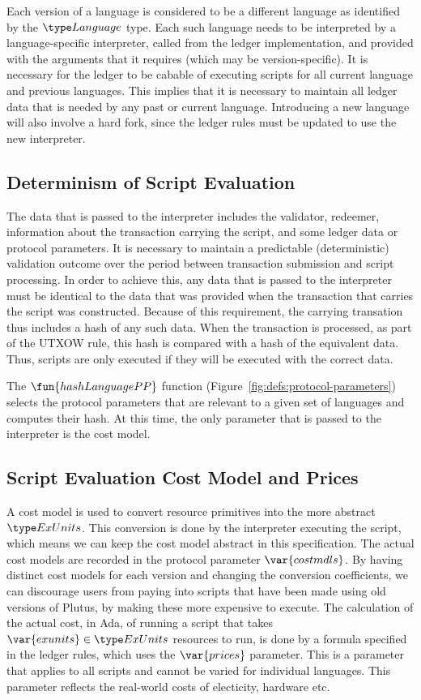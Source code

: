Each version of a language is considered to be a different language as identified by the $\Language$ type.
Each such language needs to be interpreted by a language-specific interpreter, called from the ledger implementation,
and provided with the arguments that it requires (which may be version-specific).
It is necessary for the ledger to be cabable of executing scripts for all current language and previous languages.
This implies that it is necessary to maintain all ledger
data that is needed by any past or current language. Introducing a new language will also
involve a hard fork, since the ledger rules must be updated to use the new interpreter.

\subsection{Determinism of Script Evaluation}
\label{sec:determinism}

The data that is passed to the interpreter
includes the validator, redeemer, information about the transaction carrying
the script, and some ledger data or protocol parameters.
It is necessary to maintain a predictable (deterministic) validation outcome over the period between transaction
submission and script processing.
%
In order to achieve this,
any data that is passed to the interpreter must be
identical to the data that was provided when the transaction that carries the script was
constructed.
Because of this requirement, the carrying transation thus includes a hash of any such data.
When the transaction is processed, as part of the UTXOW rule, this hash is compared with a hash of the equivalent data. Thus, scripts are only executed if they will be executed with the correct data.

The $\fun{hashLanguagePP}$ function (Figure~\ref{fig:defs:protocol-parameters}) selects the protocol parameters that are relevant to
a given set of languages and computes their hash.
%
At this time, the only parameter that is passed to the interpreter is the cost model.

\subsection{Script Evaluation Cost Model and Prices}
\label{sec:cost-mod}

A cost model is used to convert resource primitives into the
more abstract $\ExUnits$. This conversion is done by the interpreter executing the script,
which means we can keep the cost model abstract in this specification.
The actual cost models are recorded in the protocol parameter $\var{costmdls}$.
%
By having distinct cost models for each version and changing the conversion coefficients, we can discourage users from
paying into scripts that have been made using old versions of Plutus, by making these more expensive to execute.
%
The calculation of the actual cost, in Ada, of running
a script that takes $\var{exunits} \in \ExUnits$ resources to run,
is done by a formula specified in the ledger rules, which uses the
$\var{prices}$ parameter. This is a parameter that applies to all
scripts and cannot be varied for individual languages. This parameter
reflects the real-world costs of electicity, hardware etc.

